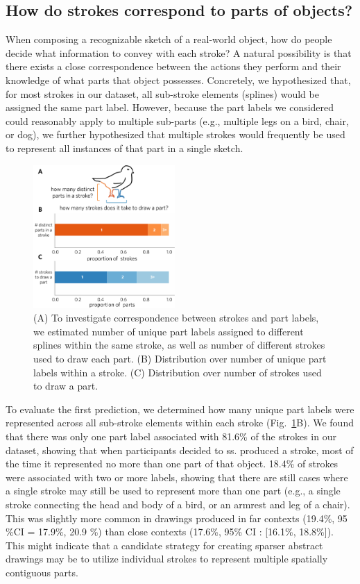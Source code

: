 \documentclass[10pt,letterpaper]{article}
\begin{document}
\subsection{How do strokes correspond to parts of objects?}

When composing a recognizable sketch of a real-world object, how do people decide what information to convey with each stroke? 
A natural possibility is that there exists a close correspondence between the actions they perform and their knowledge of what parts that object possesses. %
Concretely, we hypothesized that, for most strokes in our dataset, all sub-stroke elements (splines) would be assigned the same part label. 
However, because the part labels we considered could reasonably apply to multiple sub-parts (e.g., multiple legs on a bird, chair, or dog), we further hypothesized that multiple strokes would frequently be used to represent all instances of that part in a single sketch.

\begin{figure}[htbp]
\centering
\includegraphics[width=0.48\textwidth]{figures/5_stroke_part_relationship.pdf}
\caption{(A) To investigate correspondence between strokes and part labels, we estimated number of unique part labels assigned to different splines within the same stroke, as well as number of different strokes used to draw each part. (B) Distribution over number of unique part labels within a stroke. (C) Distribution over number of strokes used to draw a part.}
\label{stroke_to_part}
\end{figure}

To evaluate the first prediction, we determined how many unique part labels were represented across all sub-stroke elements within each stroke (Fig.~\ref{stroke_to_part}B). 
We found that there was only one part label associated with 81.6\% of the strokes in our dataset, showing that when participants decided to  ss. produced a stroke, most of the time it represented no more than one part of that object. 
18.4\% of strokes were associated with two or more labels, showing that there are still cases where a single stroke may still be used to represent more than one part (e.g., a single stroke connecting the head and body of a bird, or an armrest and leg of a chair). 
This was slightly more common in drawings produced in far contexts (19.4\%, 95 \%CI = 17.9\%, 20.9 \%) than close contexts (17.6\%, 95\% CI : [16.1\%, 18.8\%]).  This might indicate that a candidate strategy for creating sparser abstract drawings may be to utilize individual strokes to represent multiple spatially contiguous parts. 
\end{document}
